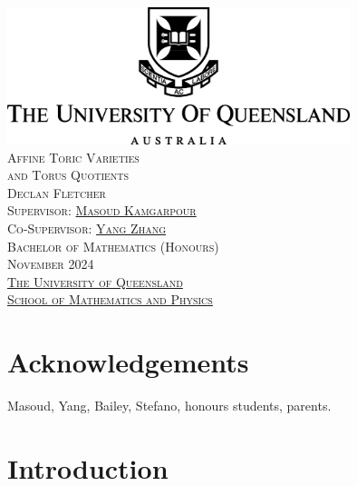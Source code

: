 \documentclass[12pt]{amsart}
\theoremstyle{plain}
\theoremstyle{definition}
\begin{document}

\begin{center}
\thispagestyle{empty}
\includegraphics[width=10cm]{../images/UQLogo.jpg} \\ 
\vspace{3cm}
{\LARGE\textsc{Affine Toric Varieties}} \\
\vspace{0.1cm}
{\LARGE\textsc{and Torus Quotients}} \\
\vspace{0.5cm}
{\textsc{Declan Fletcher}} \\
\vspace{7cm}
{\textsc{Supervisor: \href{https://sites.google.com/site/masoudkomi/home}{Masoud Kamgarpour}}} \\
{\textsc{Co-Supervisor: \href{https://sites.google.com/site/yangzhang139/home}{Yang Zhang}}} \\
\vspace{1cm}
{\textsc{ Bachelor of Mathematics (Honours)}} \\
\vspace{0.1cm}
{\textsc{November 2024}} \\
\vspace{1cm}
{\textsc{\href{https://www.uq.edu.au/}{The University of Queensland}}} \\
{\textsc{\href{https://smp.uq.edu.au/}{School of Mathematics and Physics}}}
\end{center}

\newpage
\hfill

\newpage
\tableofcontents

\newpage
\hfill

\newpage
{}
\section*{Acknowledgements}
Masoud, Yang, Bailey, Stefano, honours students, parents.

\newpage
\hfill

\newpage
{}
\section*{Introduction}\label{chapter:introduction}
\end{document}
